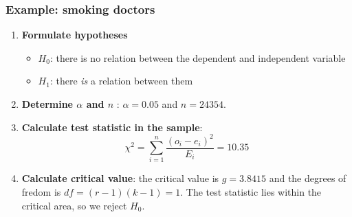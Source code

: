 \documentclass{beamer}
\begin{document}
\begin{frame}
  \frametitle{Example: smoking doctors}
  \begin{enumerate}
  \item \textbf{Formulate hypotheses}
    \begin{itemize}
      \item $H_{0}$: there is no relation between the dependent and independent variable
      \item $H_{1}$: there \emph{is} a relation between them
    \end{itemize}
  \item \textbf{Determine $\alpha$ and $n$} : $\alpha = 0.05$ and $n = 24354$.
  \item \textbf{Calculate test statistic in the sample}:
  \[ \chi^{2} = \sum_{i=1}^{n} \frac{(o_{i} - e_{i})^{2}}{E_{i}} = 10.35 \]
  \item \textbf{Calculate critical value}: the critical value is $g = 3.8415$ and the degrees of fredom is $df = (r-1)(k-1) = 1$. The test statistic lies within the critical area, so we reject $H_{0}$.
\end{enumerate}
\end{frame}
\end{document}
